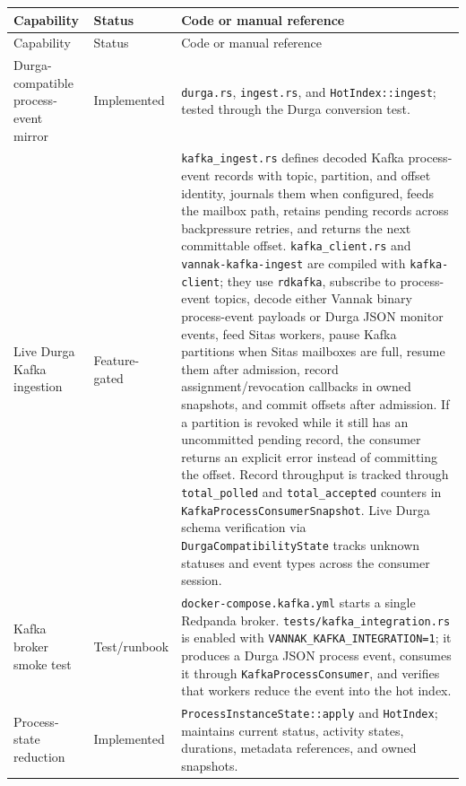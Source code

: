 \begin{longtable}{p{}p{}p{}}
\hline
Capability & Status & Code or manual reference \\
\hline
\endfirsthead
\hline
Capability & Status & Code or manual reference \\
\hline
\endhead
\hline
\endfoot
Durga-compatible process-event mirror & Implemented &
\texttt{durga.rs}, \texttt{ingest.rs}, and \texttt{HotIndex::ingest}; tested
through the Durga conversion test. \\

Live Durga Kafka ingestion & Feature-gated &
\texttt{kafka\_ingest.rs} defines decoded Kafka process-event records with
topic, partition, and offset identity, journals them when configured, feeds the
\sitas{} mailbox path, retains pending records across backpressure retries, and
returns the next committable offset.
\texttt{kafka\_client.rs} and \texttt{vannak-kafka-ingest} are compiled with
\texttt{kafka-client}; they use \texttt{rdkafka}, subscribe to process-event
topics, decode either Vannak binary process-event payloads or Durga JSON monitor
events, feed Sitas workers, pause Kafka partitions when Sitas mailboxes are
full, resume them after admission, record assignment/revocation callbacks in
owned snapshots, and commit offsets after admission. If a partition is revoked
while it still has an uncommitted pending record, the consumer returns an
explicit error instead of committing the offset. Record throughput is tracked
through \texttt{total\_polled} and \texttt{total\_accepted} counters in
\texttt{KafkaProcessConsumerSnapshot}. Live Durga schema verification via
\texttt{DurgaCompatibilityState} tracks unknown statuses and event types across
the consumer session. \\

Kafka broker smoke test & Test/runbook &
\texttt{docker-compose.kafka.yml} starts a single Redpanda broker.
\texttt{tests/kafka\_integration.rs} is enabled with
\texttt{VANNAK\_KAFKA\_INTEGRATION=1}; it produces a Durga JSON process event,
consumes it through \texttt{KafkaProcessConsumer}, and verifies that \sitas{}
workers reduce the event into the hot index. \\

Process-state reduction & Implemented &
\texttt{ProcessInstanceState::apply} and \texttt{HotIndex}; maintains current
status, activity states, durations, metadata references, and owned snapshots. \\


\end{longtable}
